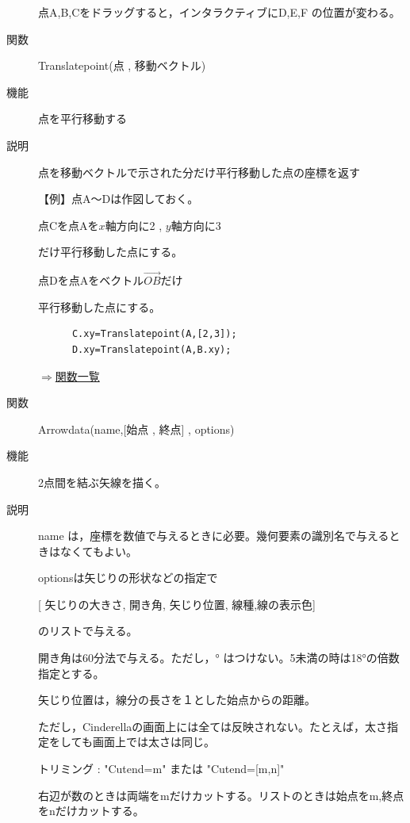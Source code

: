 \documentclass[papersize,a4paper,12pt,uplatex]{jsarticle}
\begin{document}
\begin{description}
点A,B,Cをドラッグすると，インタラクティブにD,E,F の位置が変わる。

\vspace{\baselineskip}
\hypertarget{translatepoint}{}
\item[関数]  Translatepoint(点 , 移動ベクトル)
\item[機能]  点を平行移動する
\item[説明]  点を移動ベクトルで示された分だけ平行移動した点の座標を返す

\vspace{\baselineskip}
【例】点A〜Dは作図しておく。

点Cを点Aを$x$軸方向に2 , $y$軸方向に3

だけ平行移動した点にする。

点Dを点Aをベクトル$\overrightarrow{OB} $だけ

平行移動した点にする。
\begin{verbatim}
      C.xy=Translatepoint(A,[2,3]);
      D.xy=Translatepoint(A,B.xy);
\end{verbatim}

\hspace{20mm} 

\begin{flushright}  \hyperlink{functionlist}{$\Rightarrow$関数一覧}\end{flushright}

\hypertarget{arrowdata}{}
\item[関数]  Arrowdata(name,[始点 , 終点] , options) 
\item[機能]  2点間を結ぶ矢線を描く。
\item[説明]  name は，座標を数値で与えるときに必要。幾何要素の識別名で与えるときはなくてもよい。

optionsは矢じりの形状などの指定で
  
\hspace{10mm} [ 矢じりの大きさ, 開き角, 矢じり位置, 線種,線の表示色] 

のリストで与える。
  
開き角は60分法で与える。ただし，° はつけない。5未満の時は18°の倍数指定とする。
  
  矢じり位置は，線分の長さを１とした始点からの距離。
  
ただし，Cinderellaの画面上には全ては反映されない。たとえば，太さ指定をしても画面上では太さは同じ。
 
 トリミング :  "Cutend=m" または "Cutend=[m,n]" 

右辺が数のときは両端をmだけカットする。リストのときは始点をm,終点をnだけカットする。


\end{description}
\end{document}
